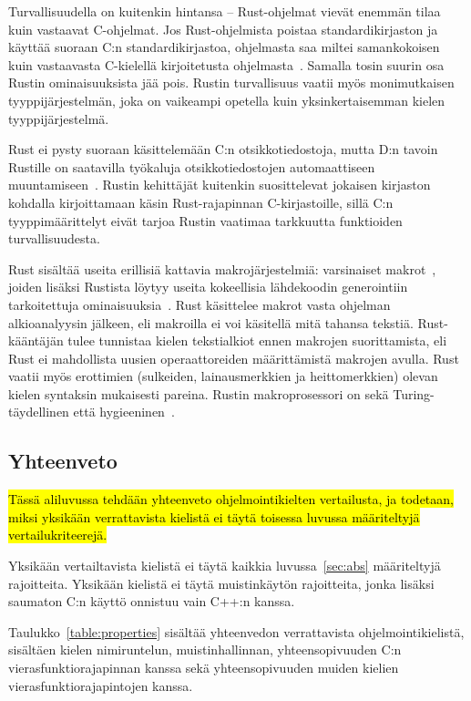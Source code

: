 Turvallisuudella on kuitenkin hintansa -- Rust-ohjelmat vievät enemmän tilaa
kuin vastaavat C-ohjelmat. Jos Rust-ohjelmista poistaa standardikirjaston ja
käyttää suoraan C:n standardikirjastoa, ohjelmasta saa miltei samankokoisen
kuin vastaavasta C-kielellä kirjoitetusta ohjelmasta~\citep{rustbinarysize}.
Samalla tosin suurin osa Rustin ominaisuuksista jää pois. Rustin turvallisuus
vaatii myös monimutkaisen tyyppijärjestelmän, joka on vaikeampi opetella kuin
yksinkertaisemman kielen tyyppijärjestelmä.

Rust ei pysty suoraan käsittelemään C:n otsikkotiedostoja, mutta D:n tavoin
Rustille on saatavilla työkaluja otsikkotiedostojen automaattiseen
muuntamiseen~\citep{rustbindgen}. Rustin kehittäjät kuitenkin suosittelevat
jokaisen kirjaston kohdalla kirjoittamaan käsin Rust-rajapinnan C-kirjastoille,
sillä C:n tyyppimäärittelyt eivät tarjoa Rustin vaatimaa tarkkuutta funktioiden
turvallisuudesta.

Rust sisältää useita erillisiä kattavia makrojärjestelmiä:
varsinaiset makrot~\citep{rustmacros}, joiden lisäksi Rustista löytyy useita
kokeellisia lähdekoodin generointiin tarkoitettuja
ominaisuuksia~\citep{rustprocmacros, rustplugins}. Rust käsittelee makrot vasta
ohjelman alkioanalyysin jälkeen, eli makroilla ei voi käsitellä mitä tahansa
tekstiä. Rust-kääntäjän tulee tunnistaa kielen tekstialkiot ennen makrojen
suorittamista, eli Rust ei mahdollista uusien operaattoreiden määrittämistä
makrojen avulla. Rust vaatii myös erottimien (sulkeiden, lainausmerkkien ja
heittomerkkien) olevan kielen syntaksin mukaisesti pareina. Rustin
makroprosessori on sekä Turing-täydellinen että hygieeninen~\citep{rustmacros}.

\subsection{Yhteenveto}

\hl{Tässä aliluvussa tehdään yhteenveto ohjelmointikielten vertailusta, ja
todetaan, miksi yksikään verrattavista kielistä ei täytä toisessa luvussa
määriteltyjä vertailukriteerejä.}

Yksikään vertailtavista kielistä ei täytä kaikkia luvussa~\ref{sec:abs}
määriteltyjä rajoitteita. Yksikään kielistä ei täytä muistinkäytön rajoitteita,
jonka lisäksi saumaton C:n käyttö onnistuu vain C++:n kanssa.

Taulukko~\ref{table:properties} sisältää yhteenvedon verrattavista
ohjelmointikielistä, sisältäen kielen nimiruntelun, muistinhallinnan,
yhteensopivuuden C:n vierasfunktiorajapinnan kanssa sekä yhteensopivuuden
muiden kielien vierasfunktiorajapintojen kanssa.

